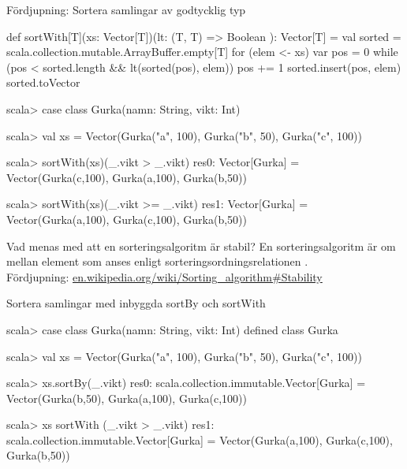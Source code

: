 \begin{Slide}{Fördjupning: Sortera samlingar av godtycklig typ}
\vspace{-0.25em}
\begin{Code}
def sortWith[T](xs: Vector[T])(lt: (T, T) => Boolean ): Vector[T] = {
  val sorted = scala.collection.mutable.ArrayBuffer.empty[T]
  for (elem <- xs) {
     var pos = 0
     while (pos < sorted.length && lt(sorted(pos), elem)) {
       pos += 1
     }
     sorted.insert(pos, elem)
  }
  sorted.toVector
}
\end{Code}
\pause\vspace{-0.25em}
\begin{REPL}
scala> case class Gurka(namn: String, vikt: Int)

scala> val xs = Vector(Gurka("a", 100), Gurka("b", 50), Gurka("c", 100))

scala> sortWith(xs)(_.vikt > _.vikt)
res0: Vector[Gurka] = Vector(Gurka(c,100), Gurka(a,100), Gurka(b,50))

scala> sortWith(xs)(_.vikt >= _.vikt)
res1: Vector[Gurka] = Vector(Gurka(a,100), Gurka(c,100), Gurka(b,50))
\end{REPL}
\end{Slide}


\begin{Slide}{Vad menas med att en sorteringsalgoritm är stabil?}
En sorteringsalgoritm är  om  mellan element som anses  enligt sorteringsordningsrelationen .\\\vspace{1em}
Fördjupning:
\href{https://en.wikipedia.org/wiki/Sorting_algorithm#Stability}
{en.wikipedia.org/wiki/Sorting\_algorithm\#Stability}
\end{Slide}

\begin{Slide}{Sortera samlingar med inbyggda sortBy och sortWith}
\begin{REPL}
scala> case class Gurka(namn: String, vikt: Int)
defined class Gurka

scala> val xs = Vector(Gurka("a", 100), Gurka("b", 50), Gurka("c", 100))

scala> xs.sortBy(_.vikt)
res0: scala.collection.immutable.Vector[Gurka] =
        Vector(Gurka(b,50), Gurka(a,100), Gurka(c,100))

scala> xs sortWith (_.vikt > _.vikt)
res1: scala.collection.immutable.Vector[Gurka] =
        Vector(Gurka(a,100), Gurka(c,100), Gurka(b,50))

\end{REPL}
\end{Slide}



